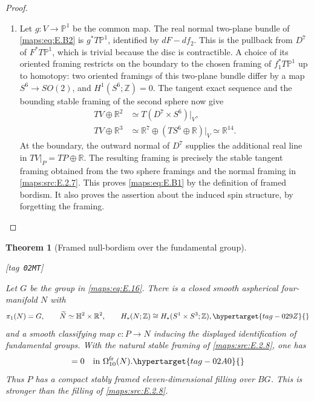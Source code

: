 \documentclass[11pt,a4paper]{article}
\makeatletter
\numberwithin{equation}{section}
\newtheorem{theorem}{Theorem}[section]
\theoremstyle{definition}
\newcommand{\StatementRecord}[4]{{\upshape\footnotesize[tag~\texttt{#3}]}\enspace\ignorespaces}
\newcommand{\SeriesRefText}[1]{\ifcsname SRef@#1\endcsname\csname SRef@#1\endcsname\else\textbf{UNRESOLVED}\fi}
\newcommand{\SeriesRef}[1]{\ifmmode\text{\SeriesRefText{#1}}\else\SeriesRefText{#1}\fi}
\makeatother
\begin{document}
\begin{proof}
\begin{enumerate}[label=\arabic*.,leftmargin=*]
\item Let $g:V\to\mathbb P^1$ be the common map. The real normal
two-plane bundle of \eqref{maps:eq:E.B2} is $g^*T\mathbb P^1$, identified by
$dF-df_2$. This is the pullback from $D^7$ of $F^*T\mathbb P^1$,
which is trivial because the disc is contractible. A choice of
its oriented framing restricts on the boundary to the chosen
framing of $f_1^*T\mathbb P^1$ up to homotopy: two oriented
framings of this two-plane bundle differ by a map
$S^6\to SO(2)$, and $H^1(S^6;\mathbb Z)=0$.
The tangent exact sequence and the bounding stable framing of
the second sphere now give
\[
 \begin{split}
 TV\oplus\mathbb R^2&\simeq
       T(D^7\times S^6)|_V,\\
 TV\oplus\mathbb R^3&\simeq
       \mathbb R^7\oplus(TS^6\oplus\mathbb R)|_V
       \simeq\mathbb R^{14}.
 \end{split}
\]
At the boundary, the outward normal of $D^7$ supplies the
additional real line in $TV|_P=TP\oplus\mathbb R$.
The resulting framing is precisely the stable tangent framing
obtained from the two sphere framings and the normal framing
in \ref{maps:src:E.2.7}. This proves \eqref{maps:eq:E.B1} by the definition of framed bordism.
It also proves the assertion about the induced spin structure,
by forgetting the framing.

\end{enumerate}
\end{proof}


\begin{theorem}[Framed null-bordism over the fundamental group]\hypertarget{tag-02MT}{}\label{maps:src:E.2.9}
\StatementRecord{maps:src:E.2.9}{proved}{02MT}{\eqref{maps:eq:E.16}, \cref{maps:src:E.2.8}, \SeriesRef{maps:src:B.2.1}, \SeriesRef{maps:src:E.2.2}, \cref{maps:src:E.2.3}, \SeriesRef{maps:src:B.1.2}, \eqref{maps:eq:E.B7}; \cite[Theorems 2.3--2.4 and the Euler-number discussion in
Section 2]{rootScott83}; \cite[Definition 8.16 and Theorem 8.17]{rootDavisKirk01}; \cite[Corollary~1.3 and Table~1, pp.~112--113]{IsaksenWangXu2023}}


Let $G$ be the group in \eqref{maps:eq:E.16}. There is a closed smooth
aspherical four-manifold $N$ with
\begin{equation}
 \pi_1(N)=G,\qquad \widetilde N\simeq\mathbb H^2\times\mathbb R^2,
 \qquad H_*(N;\mathbb Z)\cong H_*(S^1\times S^3;\mathbb Z),
 \hypertarget{tag-029Z}{}\label{maps:eq:E.B3}
\end{equation}
and a smooth classifying map $c:P\to N$ inducing the displayed
identification of fundamental groups. With the natural stable
framing of \ref{maps:src:E.2.8}, one has
\begin{equation}
                 [P,c]=0\quad\hbox{in }\Omega^{\mathrm{fr}}_{10}(N).
 \hypertarget{tag-02A0}{}\label{maps:eq:E.B4}
\end{equation}
Thus $P$ has a compact stably framed eleven-dimensional filling
over $BG$. This is stronger than the filling of \ref{maps:src:E.2.8}.
\end{theorem}
\end{document}

